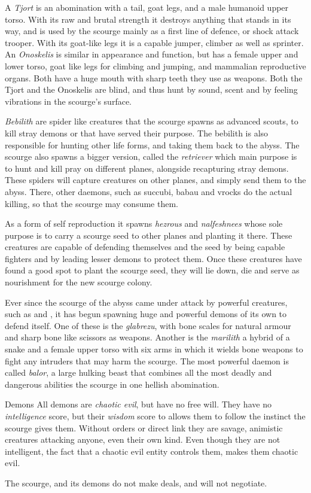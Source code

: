 A \emph{Tjort} is an abomination with a tail, goat legs, and a male humanoid
upper torso.  With its raw and brutal strength it destroys anything that
stands in its way, and is used by the scourge mainly as a first line of
defence, or shock attack trooper. With its goat-like legs it is a capable
jumper, climber as well as sprinter. An \emph{Onoskelis} is similar in
appearance and function, but has a female upper and lower torso, goat like
legs for climbing and jumping, and mammalian reproductive organs. Both have a
huge mouth with sharp teeth they use as weapons. Both the Tjort and the
Onoskelis are blind, and thus hunt by sound, scent and by feeling vibrations
in the scourge's surface.

\emph{Bebilith} are spider like creatures that the scourge spawns as advanced
scouts, to kill stray demons or that have served their purpose. The bebilith
is also responsible for hunting other life forms, and taking them back to the
abyss. The scourge also spawns a bigger version, called the \emph{retriever}
which main purpose is to hunt and kill pray on different planes, alongside
recapturing stray demons. These spiders will capture creatures on other planes,
and simply send them to the abyss. There, other daemons, such as succubi,
babau and vrocks do the actual killing, so that the scourge may consume them.

As a form of self reproduction it spawns \emph{hezrous} and \emph{nalfeshnees}
whose sole purpose is to carry a scourge seed to other planes and planting
it there. These creatures are capable of defending themselves and the seed
by being capable fighters and by leading lesser demons to protect them. Once
these creatures have found a good spot to plant the scourge seed, they will
lie down, die and serve as nourishment for the new scourge colony.

Ever since the scourge of the abyss came under attack by powerful creatures,
such as  and , it has begun spawning
huge and powerful demons of its own to defend itself. One of these is the
\emph{glabrezu}, with bone scales for natural armour and sharp bone like
scissors as weapons. Another is the \emph{marilith} a hybrid of a snake and
a female upper torso with six arms in which it wields bone weapons to fight
any intruders that may harm the scourge. The most powerful daemon is called
\emph{balor}, a large hulking beast that combines all the most deadly and
dangerous abilities the scourge in one hellish abomination.

\begin{35e}{Demons}
  All demons are \emph{chaotic evil}, but have no free will. They
  have no \emph{intelligence} score, but their \emph{wisdom} score to allows
  them to follow the instinct the scourge gives them. Without orders or direct
  link they are savage, animistic creatures attacking anyone, even their own
  kind. Even though they are not intelligent, the fact that a chaotic evil
  entity controls them, makes them chaotic evil.

  The scourge, and its demons do not make deals, and will not negotiate.
\end{35e}
